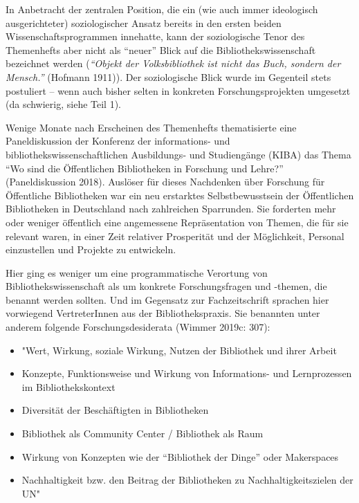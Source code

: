 \documentclass[a4paper,
fontsize=11pt,
oneside,
numbers=noperiodatend,
parskip=half-,
bibliography=totoc,
final
]{scrartcl}
\begin{document}
In Anbetracht der zentralen Position, die ein (wie auch immer
ideologisch ausgerichteter) soziologischer Ansatz bereits in den ersten
beiden Wissenschaftsprogrammen innehatte, kann der soziologische Tenor
des Themenhefts aber nicht als \enquote{neuer} Blick auf die
Bibliothekswissenschaft bezeichnet werden (\emph{\enquote{Objekt der
Volksbibliothek ist nicht das Buch, sondern der Mensch.}} (Hofmann
1911)). Der soziologische Blick wurde im Gegenteil stets postuliert --
wenn auch bisher selten in konkreten Forschungsprojekten umgesetzt (da
schwierig, siehe Teil 1).

Wenige Monate nach Erscheinen des Themenhefts thematisierte eine
Paneldiskussion der Konferenz der informations- und
bibliothekswissenschaftlichen Ausbildungs- und Studiengänge (KIBA) das
Thema \enquote{Wo sind die Öffentlichen Bibliotheken in Forschung und
Lehre?} (Paneldiskussion 2018). Auslöser für dieses Nachdenken über
Forschung für Öffentliche Bibliotheken war ein neu erstarktes
Selbstbewusstsein der Öffentlichen Bibliotheken in Deutschland nach
zahlreichen Sparrunden. Sie forderten mehr oder weniger öffentlich eine
angemessene Repräsentation von Themen, die für sie relevant waren, in
einer Zeit relativer Prosperität und der Möglichkeit, Personal
einzustellen und Projekte zu entwickeln.

Hier ging es weniger um eine programmatische Verortung von
Bibliothekswissenschaft als um konkrete Forschungsfragen und -themen,
die benannt werden sollten. Und im Gegensatz zur Fachzeitschrift
sprachen hier vorwiegend VertreterInnen aus der Bibliothekspraxis. Sie
benannten unter anderem folgende Forschungsdesiderata (Wimmer 2019c:
307):

\begin{itemize}
\item
  "Wert, Wirkung, soziale Wirkung, Nutzen der Bibliothek und ihrer
  Arbeit
\item
  Konzepte, Funktionsweise und Wirkung von Informations- und
  Lernprozessen im Bibliothekskontext
\item
  Diversität der Beschäftigten in Bibliotheken
\item
  Bibliothek als Community Center / Bibliothek als Raum
\item
  Wirkung von Konzepten wie der \enquote{Bibliothek der Dinge} oder
  Makerspaces
\item
  Nachhaltigkeit bzw. den Beitrag der Bibliotheken zu
  Nachhaltigkeitszielen der UN"
\end{itemize}
\end{document}
